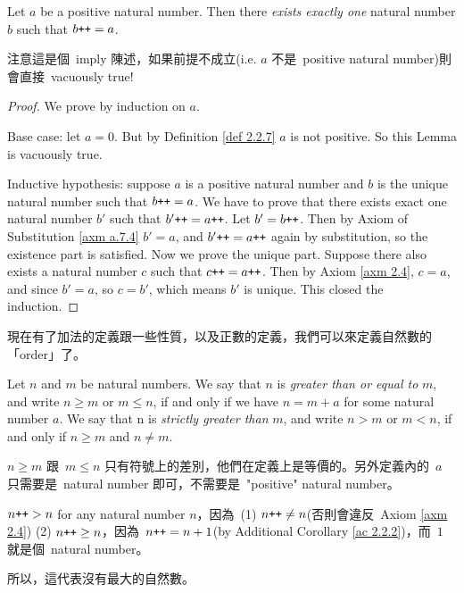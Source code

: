 \begin{lemma}\label{lem 2.2.10}
Let \(a\) be a positive natural number. Then there \emph{exists exactly one} natural number \(b\) such that \(b\texttt{++} = a\).
\end{lemma}
\begin{note}
注意這是個\ imply 陳述，如果前提不成立(i.e. \(a\) 不是\ positive natural number)則會直接\ vacuously true!
\end{note}
\begin{proof}
We prove by induction on \(a\).

Base case: let \(a = 0\). But by Definition \ref{def 2.2.7} \(a\) is not positive. So this Lemma is vacuously true.

Inductive hypothesis: suppose \(a\) is a positive natural number and \(b\) is the unique natural number such that \(b\texttt{++} = a\). We have to prove that there exists exact one natural number \(b'\) such that \(b'\texttt{++} = a\texttt{++}\). Let \(b' = b\texttt{++}\). Then by Axiom of Substitution \ref{axm a.7.4} \(b' = a\), and \(b'\texttt{++} = a\texttt{++}\) again by substitution, so the existence part is satisfied. Now we prove the unique part. Suppose there also exists a natural number \(c\) such that \(c\texttt{++} = a\texttt{++}\). Then by Axiom \ref{axm 2.4}, \(c = a\), and since \(b' = a\), so \(c = b'\), which means \(b'\) is unique. This closed the induction.
\end{proof}

\begin{note}
現在有了加法的定義跟一些性質，以及正數的定義，我們可以來定義自然數的「order」了。
\end{note}

\begin{definition} \label{def 2.2.11} Let \(n\) and \(m\) be natural numbers. We say that \(n\) is \emph{greater than or equal to} \(m\), and write \(n \geq m\) or \(m \leq n\), if and only if we have \(n = m + a\) for some natural number \(a\). We say that n is \emph{strictly greater than} \(m\), and write \(n > m\) or \(m < n\), if and only if \(n \geq m\) and \(n \neq m\).
\end{definition}
\begin{note}
\(n \geq m\) 跟\ \(m \leq n\) 只有符號上的差別，他們在定義上是等價的。另外定義內的\ \(a\) 只需要是\ natural number 即可，不需要是\ "positive" natural number。
\end{note}
\begin{additional corollary} \label{ac 2.2.3}
\(n\texttt{++} > n\) for any natural number \(n\)，因為\ (1) \(n\texttt{++} \neq n\)(否則會違反\ Axiom \ref{axm 2.4}) (2) \(n\texttt{++} \geq n\)，因為\ \(n\texttt{++} = n + 1\)(by Additional Corollary \ref{ac 2.2.2})，而\ \(1\) 就是個\ natural number。

所以，這代表沒有最大的自然數。
\end{additional corollary}

